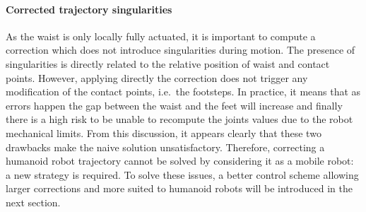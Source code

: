 \paragraph{Corrected trajectory singularities}
As the waist is only locally fully actuated, it is important to compute
a correction which does not introduce singularities during motion. The
presence of singularities is directly related to the relative position
of waist and contact points. However, applying directly the correction
does not trigger any modification of the contact points, i.e.\ the
footsteps. In practice, it means that as errors happen the gap between
the waist and the feet will increase and finally there is a high risk
to be unable to recompute the joints values due to the robot
mechanical limits.
%
%
From this discussion, it appears clearly that these two drawbacks make
the naive solution unsatisfactory. Therefore, correcting a humanoid
robot trajectory cannot be solved by considering it as a mobile robot:
a new strategy is required. To solve these issues, a better control
scheme allowing larger corrections and more suited to humanoid robots
will be introduced in the next section.
%
%
\FloatBarrier
%
